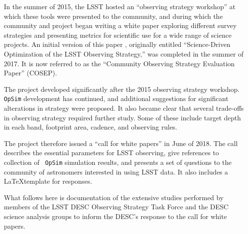 In the summer of 2015, the LSST hosted an ``observing strategy
workshop'' at which these tools were presented to the community, and
during which the community and project began writing a white paper
exploring different survey strategies and presenting metrics for
scientific use for a wide range of science projects. An initial
version of this paper \citep{2017arXiv170804058L}, originally entitled
``Science-Driven Optimization of the LSST Observing Strategy,'' was
completed in the summer of 2017. It is now referred to as the
``Community Observing Strategy Evaluation Paper'' (COSEP).

The project developed significantly after the 2015 observing
strategy workshop. {\tt OpSim} development has continued, and
additional suggestions for significant alterations in strategy were
proposed. It also became clear that several trade-offs in observing
strategy required further study. Some of these include target depth in
each band, footprint area, cadence, and observing rules.

The project therefore issued a ``call for white papers'' in June of
2018\citep{ivezic_call_2018}. The call describes the essential
parameters for LSST observing, give references to collection of {\tt
  OpSim} simulation results, and presents a set of questions to the
community of astronomers interested in using LSST data. It also
includes a \LaTeX template for responses.

What follows here is documentation of the extensive studies performed
by members of the LSST DESC Observing Strategy Task Force and the DESC
science analysis groups to inform the DESC's response to the call for
white papers.
